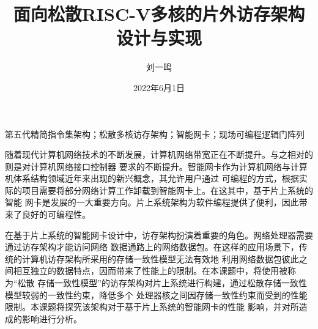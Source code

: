 \documentclass[supercite,gbt15cite,notofont]{HustGraduPaper}
\title{面向松散RISC-V多核的片外访存架构设计与实现}
\author{刘一鸣}
\date{2022年6月1日}
\begin{document}
\maketitle

\statement

\clearpage


\begin{cnabstract}{第五代精简指令集架构；松散多核访存架构；智能网卡；现场可编程逻辑门阵列}

随着现代计算机网络技术的不断发展，计算机网络带宽正在不断提升。与之相对的则是对计算机网络接口控制器
要求的不断提升。智能网卡作为计算机网络与计算机体系结构领域近年来出现的新兴概念，其允许用户通过
可编程的方式，根据实际的项目需要将部分网络计算工作卸载到智能网卡上。在这其中，基于片上系统的智能
网卡是发展的一大重要方向。片上系统架构为软件编程提供了便利，因此带来了良好的可编程性。

在基于片上系统的智能网卡设计中，访存架构扮演着重要的角色。网络处理器需要通过访存架构才能访问网络
数据通路上的网络数据包。在这样的应用场景下，传统的计算机访存架构所采用的存储一致性模型无法有效地
利用网络数据包彼此之间相互独立的数据特点，因而带来了性能上的限制。在本课题中，将使用被称为“松散
存储一致性模型”的访存架构对片上系统进行构建，通过松散存储一致性模型较弱的一致性约束，降低多个
处理器核之间因存储一致性约束而受到的性能限制。本课题将探究该架构对于基于片上系统的智能网卡的性能
影响，并对所造成的影响进行分析。

\end{cnabstract}
\end{document}
